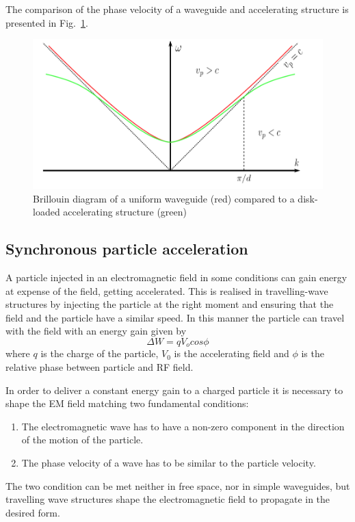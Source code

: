 The comparison of the phase velocity of a waveguide and accelerating structure is presented in Fig.~\ref{vp_fig}.



\begin{figure}[h]
\centering

\includegraphics[scale=0.4]{pictures/vp}
\caption{Brillouin diagram of a uniform waveguide (red) compared to a disk-loaded accelerating structure (green) \cite{Kovermann:1330346}}
\label{vp_fig}

\end{figure}




\subsection[Synchronous particle acceleration]{Synchronous particle acceleration}

A particle injected in an electromagnetic field in some conditions can gain energy at expense of the field, getting accelerated. This is realised in travelling-wave structures by injecting the particle at the right moment and ensuring that the field and the particle have a similar speed. In this manner the particle can travel with the field with an energy gain given by
\begin{equation}
\Delta W = q V_o cos \phi
\end{equation}
where $q$ is the charge of the particle, $V_0$ is the accelerating field and $\phi$ is the relative phase between particle and RF field.

In order to deliver a  constant energy gain to a charged particle it is necessary to shape the EM field matching  two fundamental conditions:

\begin{enumerate}
\item The electromagnetic wave has to have a non-zero component in the direction of the motion of the particle.
\item The phase velocity of a wave has to be similar to the particle velocity.
\end{enumerate}
The two condition can be met neither in free space, nor in simple waveguides, but travelling wave structures shape the electromagnetic field to propagate in the desired form.


